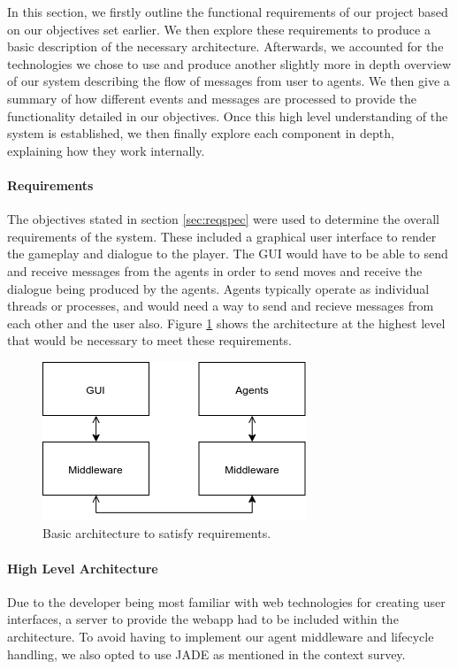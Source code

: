 \documentclass{article}
\begin{document}
In this section, we firstly outline the functional requirements of our project based on our objectives set earlier. We then explore these requirements to produce a basic description of the necessary architecture. Afterwards, we accounted for the technologies we chose to use and produce another slightly more in depth overview of our system describing the flow of messages from user to agents. We then give a summary of how different events and messages are processed to provide the functionality detailed in our objectives. Once this high level understanding of the system is established, we then finally explore each component in depth, explaining how they work internally.

\paragraph{Requirements}
The objectives stated in section \ref{sec:reqspec} were used to determine the overall requirements of the system. These included a graphical user interface to render the gameplay and dialogue to the player. The GUI would have to be able to send and receive messages from the agents in order to send moves and receive the dialogue being produced by the agents. Agents typically operate as individual threads or processes, and would need a way to send and recieve messages from each other and the user also. Figure \ref{fig:middleware} shows the architecture at the highest level that would be necessary to meet these requirements.

\begin{figure}[!ht]
	\centering
	\includegraphics[width=0.5\linewidth]{images/middleware}
	\caption{Basic architecture to satisfy requirements.}
	\label{fig:middleware}
\end{figure}

\paragraph{High Level Architecture}

Due to the developer being most familiar with web technologies for creating user interfaces, a server to provide the webapp had to be included within the architecture. To avoid having to implement our agent middleware and lifecycle handling, we also opted to use JADE as mentioned in the context survey. 
\end{document}
